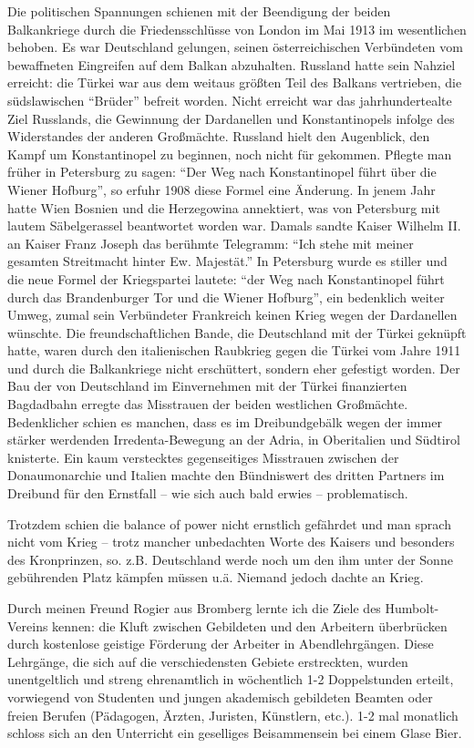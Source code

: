 \documentclass[a5paper,pagesize,10pt,twoside=true]{scrbook}
\begin{document}
Die politischen Spannungen schienen mit der Beendigung der beiden Balkankriege durch die Friedensschlüsse von London im Mai 1913 im wesentlichen behoben. Es war Deutschland gelungen, seinen österreichischen Verbündeten vom bewaffneten Eingreifen auf dem Balkan abzuhalten. Russland hatte sein Nahziel erreicht: die Türkei war aus dem weitaus größten Teil des Balkans vertrieben, die südslawischen \enquote{Brüder} befreit worden. Nicht erreicht war das jahrhundertealte Ziel Russlands, die Gewinnung der Dardanellen und Konstantinopels infolge des Widerstandes der anderen Großmächte. Russland hielt den Augenblick, den Kampf um Konstantinopel zu beginnen, noch nicht für gekommen. Pflegte man früher in Petersburg zu sagen: \enquote{Der Weg nach Konstantinopel führt über die Wiener Hofburg}, so erfuhr 1908 diese Formel eine Änderung. In jenem Jahr hatte Wien Bosnien und die Herzegowina annektiert, was von Petersburg mit lautem Säbelgerassel beantwortet worden war. Damals sandte Kaiser Wilhelm II. an Kaiser Franz Joseph das berühmte Telegramm: \enquote{Ich stehe mit meiner gesamten Streitmacht hinter Ew. Majestät.} In Petersburg wurde es stiller und die neue Formel der Kriegspartei lautete: \enquote{der Weg nach Konstantinopel führt durch das Brandenburger Tor und die Wiener Hofburg}, ein bedenklich weiter Umweg, zumal sein Verbündeter Frankreich keinen Krieg wegen der Dardanellen wünschte. Die freundschaftlichen Bande, die Deutschland mit der Türkei geknüpft hatte, waren durch den italienischen Raubkrieg gegen die Türkei vom Jahre 1911 und durch die Balkankriege nicht erschüttert, sondern eher gefestigt worden. Der Bau der von Deutschland im Einvernehmen mit der Türkei finanzierten Bagdadbahn erregte das Misstrauen der beiden westlichen Großmächte. Bedenklicher schien es manchen, dass es im Dreibundgebälk wegen der immer stärker werdenden Irredenta-Bewegung an der Adria, in Oberitalien und Südtirol knisterte. Ein kaum verstecktes gegenseitiges Misstrauen zwischen der Donaumonarchie und Italien machte den Bündniswert des dritten Partners im Dreibund für den Ernstfall -- wie sich auch bald erwies -- problematisch.

Trotzdem schien die balance of power nicht ernstlich gefährdet und man sprach nicht vom Krieg -- trotz mancher unbedachten Worte des Kaisers und besonders des Kronprinzen, so. z.B. Deutschland werde noch um den ihm unter der Sonne gebührenden Platz kämpfen müssen u.ä. Niemand jedoch dachte an Krieg.

Durch meinen Freund Rogier aus Bromberg lernte ich die Ziele des Humbolt-Vereins kennen: die Kluft zwischen Gebildeten und den Arbeitern überbrücken durch kostenlose geistige Förderung der Arbeiter in Abendlehrgängen. Diese Lehrgänge, die sich auf die verschiedensten Gebiete erstreckten, wurden unentgeltlich und streng ehrenamtlich in wöchentlich 1-2 Doppelstunden erteilt, vorwiegend von Studenten und jungen akademisch gebildeten Beamten oder freien Berufen (Pädagogen, Ärzten, Juristen, Künstlern, etc.). 1-2 mal monatlich schloss sich an den Unterricht ein geselliges Beisammensein bei einem Glase Bier.
\end{document}
